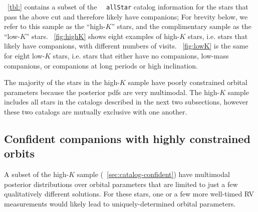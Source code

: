 \documentclass[modern, letterpaper]{aastex62}
\newcommand{\apogee}{\project{\acronym{APOGEE}}}
\newcommand{\DR}{\acronym{DR14}}
\begin{document}

\tablename~\ref{tbl:} contains a subset of the \apogee\ \DR\ \texttt{allStar}
catalog information for the stars that pass the above cut and therefore likely
have companions; For brevity below, we refer to this sample as the ``high-$K$''
stars, and the complimentary sample as the ``low-$K$'' stars.
\figurename~\ref{fig:highK} shows eight examples of high-$K$ stars, i.e. stars
that likely have companions, with different numbers of visits.
\figurename~\ref{fig:lowK} is the same for eight low-$K$ stars, i.e. stars that
either have no companions, low-mass companions, or companions at long periods or
high inclination.

The majority of the stars in the high-$K$ sample have poorly constrained orbital
parameters because the posterior pdfs are very multimodal.
The high-$K$ sample includes all stars in the catalogs described in the next two
subsections, however these two catalogs are mutually exclusive with one another.




\subsection{Confident companions with highly constrained orbits}
\label{sec:catalog-multimodal}

A subset of the high-$K$ sample (\sectionname~\ref{sec:catalog-confident}) have
multimodal posterior distributions over orbital parameters that are limited to
just a few qualitatively different solutions.
For these stars, one or a few more well-timed RV measurements would likely lead
to uniquely-determined orbital parameters.
\end{document}
